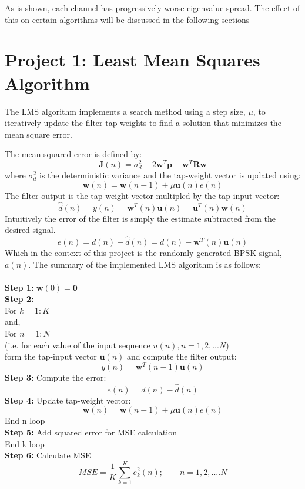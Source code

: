 \documentclass[journal]{IEEEtran}
\begin{document}
As is shown, each channel has progressively worse eigenvalue spread. The effect
of this on certain algorithms will be discussed in the following sections

\section{Project 1: Least Mean Squares Algorithm}
The LMS algorithm implements a search method using a step size, $\mu$, to iteratively update the
filter tap weights to find a solution that minimizes the mean square error\cite{widrow1976stationary}.

The mean squared error is defined by:
$$\boldsymbol{J}(n) = \sigma^2_d - 2\boldsymbol{w}^T\boldsymbol{p} + \boldsymbol{w}^T\boldsymbol{R}\boldsymbol{w}$$ where
$\sigma^2_d$ is the deterministic variance and the tap-weight vector is updated using:
$$ \boldsymbol{w}(n)= \boldsymbol{w}(n-1)+\mu\boldsymbol{u}(n)e(n)$$
The filter output is the tap-weight vector multipled by the tap input vector:
$$\hat{d}(n) = y(n) = \boldsymbol{w}^T(n)\boldsymbol{u}(n) = \boldsymbol{u}^T(n)\boldsymbol{w}(n)$$
Intuitively the error of the filter is simply the estimate subtracted from the desired signal.
$$e(n) = d(n) - \hat{d}(n) = d(n) - \boldsymbol{w}^T(n)\boldsymbol{u}(n)$$
Which in the context of this project is the randomly generated BPSK signal, $a(n)$. The summary of the implemented LMS algorithm is as follows:\\
\\
\textbf{Step 1:} $\boldsymbol{w}(0) = \boldsymbol{0} $\\
\textbf{Step 2:}\\
For $k = 1:K$\\
and,\\
For $n = 1:N$\\
(i.e. for each value of the input sequence $u(n), n = 1,2,...N$)
\\ \indent form the tap-input vector $\boldsymbol{u}(n)$ and compute the filter output:
\begin{equation}
  y(n) = \boldsymbol{w}^T(n-1)\boldsymbol{u}(n)
\end{equation}
\indent \textbf{Step 3:} Compute the error:
\begin{equation}
  e(n) = d(n) - \hat{d}(n)
\end{equation}
\indent \textbf{Step 4:} Update tap-weight vector:
\begin{equation}
  \boldsymbol{w}(n)= \boldsymbol{w}(n-1)+\mu\boldsymbol{u}(n)e(n)
\end{equation}
End n loop\\
\textbf{Step 5:} Add squared error for MSE calculation\\
End k loop\\
\textbf{Step 6:} Calculate MSE
\begin{equation}
  \label{eq:MSE}
  MSE=\dfrac{1}{K}\sum_{k=1}^{K}e_k^2(n); \qquad n = 1,2,....N
\end{equation}
\end{document}
